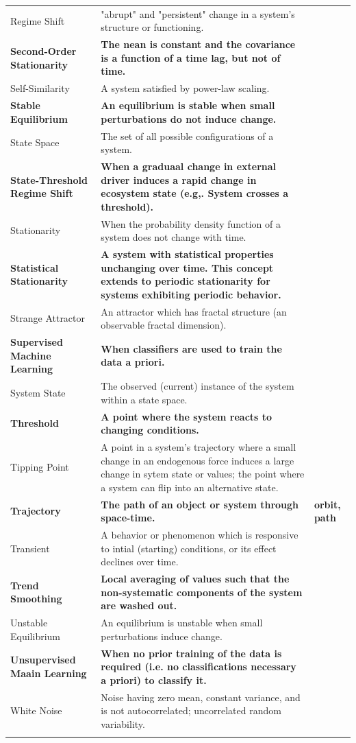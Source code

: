 \documentclass[12pt,twoside,openany]{reedthesis}
\begin{document}
\begin{longtable}{>{\raggedright\arraybackslash}p{8em}>{\raggedright\arraybackslash}p{25em}>{\raggedright\arraybackslash}p{6em}}
Regime Shift & "abrupt" and "persistent" change in a system's structure or functioning. & \\
\textbf{Second-Order Stationarity} & \textbf{The nean is constant and the covariance is a function of a time lag, but not of time.} & \textbf{}\\
Self-Similarity & A system satisfied by  power-law scaling. & \\
\textbf{Stable Equilibrium} & \textbf{An equilibrium is stable when small perturbations do not induce change.} & \textbf{}\\
\addlinespace
State Space & The set of all possible configurations of a system. & \\
\textbf{State-Threshold Regime Shift} & \textbf{When a graduaal change in external driver induces a rapid change in ecosystem state (e.g,. System crosses a threshold).} & \textbf{}\\
Stationarity & When the probability density function of a system does not change with time. & \\
\textbf{Statistical Stationarity} & \textbf{A system with statistical properties unchanging over time. This concept extends to periodic stationarity for systems exhibiting periodic behavior.} & \textbf{}\\
Strange Attractor & An attractor which has fractal structure (an observable fractal dimension). & \\
\addlinespace
\textbf{Supervised Machine Learning} & \textbf{When classifiers are used to train the data a priori.} & \textbf{}\\
System State & The observed (current) instance of the system within a state space. & \\
\textbf{Threshold} & \textbf{A point where the system reacts to changing conditions.} & \textbf{}\\
Tipping Point & A point in a system's trajectory where a small change in an endogenous force induces a large change in sytem state or values; the point where a system can flip into an alternative state. & \\
\textbf{Trajectory} & \textbf{The path of an object or system through space-time.} & \textbf{orbit, path}\\
\addlinespace
Transient & A behavior or phenomenon which is responsive to intial (starting) conditions, or its effect declines over time. & \\
\textbf{Trend Smoothing} & \textbf{Local averaging of values such that the non-systematic components of the system are washed out.} & \textbf{}\\
Unstable Equilibrium & An equilibrium is unstable when small perturbations induce change. & \\
\textbf{Unsupervised Maain Learning} & \textbf{When no prior training of the data is required (i.e. no classifications necessary a priori) to classify it.} & \textbf{}\\
White Noise & Noise having zero mean, constant variance, and is not autocorrelated; uncorrelated random variability. & \\*
\end{longtable}
\end{document}
